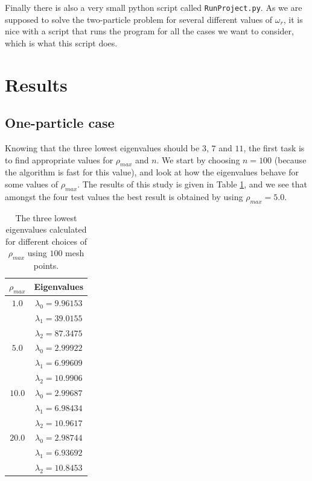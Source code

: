 \documentclass[12pt, a4paper]{article}
\begin{document}
Finally there is also a very small python script called \texttt{RunProject.py}. As we are supposed to 
solve the two-particle problem for several different values of $\omega_r$, it is nice with a script that 
runs the program for all the cases we want to consider, which is what this script does. 

\section{Results}

\subsection{One-particle case}

Knowing that the three lowest eigenvalues should be $3$, $7$ and $11$, the first task is to find 
appropriate values for $\rho_{max}$ and $n$. We start by choosing $n=100$ (because the algorithm is 
fast for this value), and look at how the eigenvalues behave for some values of $\rho_{max}$. 
The results of this study is given in Table \ref{tab:rho_max}, and we see that amongst the four 
test values the best result is obtained by using $\rho_{max} = 5.0$. 

\begin{table}[ht!]
\begin{center}
\caption{The three lowest eigenvalues calculated for different choices of $\rho_{max}$ using 
$100$ mesh points.}
\label{tab:rho_max}
\begin{tabular}{cc} \\ \hline\hline  
$\rho_{max}$ & Eigenvalues \\ \hline 
$1.0$ & $\lambda_0 = 9.96153$  \\
	  & $\lambda_1 = 39.0155$  \\
	  & $\lambda_2 = 87.3475$  \\  \hline 
$5.0$ & $\lambda_0 = 2.99922$  \\
	  & $\lambda_1 = 6.99609$  \\
	  & $\lambda_2 = 10.9906$  \\  \hline 
$10.0$ & $\lambda_0 = 2.99687$  \\
	  & $\lambda_1 = 6.98434$  \\
	  & $\lambda_2 = 10.9617$  \\  \hline 
$20.0$ & $\lambda_0 = 2.98744$  \\
	  & $\lambda_1 = 6.93692$  \\
	  & $\lambda_2 = 10.8453$  \\  \hline \hline 	  
\end{tabular}
\end{center}
\end{table} 
\end{document}
